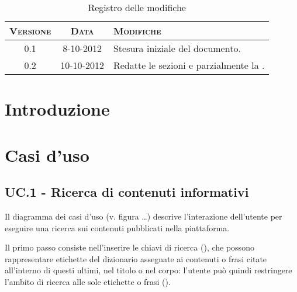 \documentclass[10pt,a4paper,headinclude,footinclude,hidelinks]{scrreprt} %
\begin{document}
    \title{\rmfamily\normalfont{}}
    \author{}
    \date{\today}
    
    \maketitle
    
    \begin{abstract}
        \noindent Il documento illustra i casi d'uso e i requisiti dell'interfaccia grafica per la visualizzazione e la navigazione dei contenuti.
    \end{abstract}
    
	\begin{table}[ht]
	\centering
	\begin{tabular}{|c|c|l|}
	\hline
	\textsc{Versione} & \textsc{Data} & \textsc{Modifiche} \\ \hline
	0.1 & 8-10-2012 & Stesura iniziale del documento. \\ \hline
	0.2 & 10-10-2012 & Redatte le sezioni \nameref{ch:stage:ar:uc:1} e parzialmente la \nameref{ch:stage:ar:uc:2}. \\ \hline

	\end{tabular}
	\caption{Registro delle modifiche}
	\label{tab:stage:wp:workload}
	\end{table}

	\tableofcontents

	\chapter{Introduzione}
	\label{ch:stage:ar:intro}

	\chapter{Casi d'uso}
	\label{ch:stage:ar:uc}

	\section[UC.1]{UC.1 - Ricerca di contenuti informativi}
	\label{ch:stage:ar:uc:1}
	Il diagramma dei casi d'uso (v. figura \ldots) descrive l'interazione dell'utente per eseguire una ricerca sui contenuti pubblicati nella piattaforma.

	Il primo passo consiste nell'inserire le chiavi di ricerca (), che possono rappresentare etichette del dizionario assegnate ai contenuti o frasi citate all'interno di questi ultimi, nel titolo o nel corpo: l'utente può quindi restringere l'ambito di ricerca alle sole etichette o frasi ().
\end{document}
